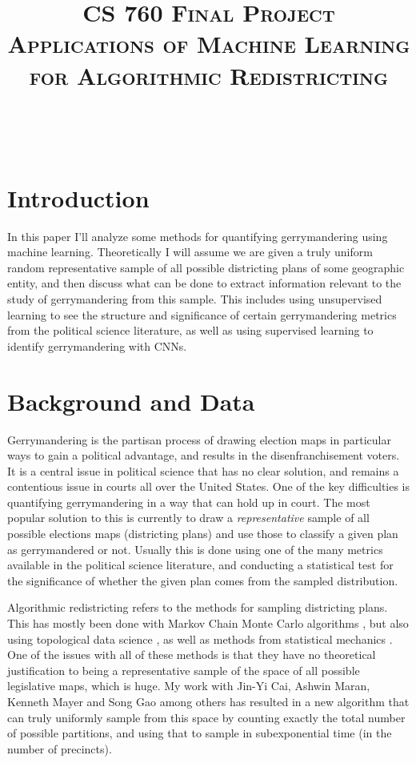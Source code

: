 \documentclass[a4paper]{article}
\title{\textsc{CS 760 Final Project\\Applications of Machine Learning for Algorithmic Redistricting}} %
\author{
	\red{Daniel Szabo} \\
	\red{9074762189}\\
}
\date{}
\theoremstyle{definition}
\begin{document}
	
	\maketitle 
	
	\section{Introduction}
	In this paper I'll analyze some methods for quantifying gerrymandering using machine learning. Theoretically I will assume we are given a truly uniform random representative sample of all possible districting plans of some geographic entity, and then discuss what can be done to extract information relevant to the study of gerrymandering from this sample. This includes using unsupervised learning to see the structure and significance of certain gerrymandering metrics from the political science literature, as well as using supervised learning to identify gerrymandering with CNNs.
	
	\section{Background and Data}
	
	Gerrymandering is the partisan process of drawing election maps in particular ways to gain a political advantage, and results in the disenfranchisement voters. It is a central issue in political science that has no clear solution, and remains a contentious issue in courts all over the United States. One of the key difficulties is quantifying gerrymandering in a way that can hold up in court. The most popular solution to this is currently to draw a \emph{representative} sample of all possible elections maps (districting plans) and use those to classify a given plan as gerrymandered or not. Usually this is done using one of the many metrics available in the political science literature, and conducting a statistical test for the significance of whether the given plan comes from the sampled distribution.
	
	Algorithmic redistricting refers to the methods for sampling districting plans. This has mostly been done with Markov Chain Monte Carlo algorithms \cite{ReCom}, but also using topological data science \cite{TDS}, as well as methods from statistical mechanics \cite{StatPhys}. One of the issues with all of these methods is that they have no theoretical justification to being a representative sample of the space of all possible legislative maps, which is huge. My work with Jin-Yi Cai, Ashwin Maran, Kenneth Mayer and Song Gao among others has resulted in a new algorithm that can truly uniformly sample from this space by counting exactly the total number of possible partitions, and using that to sample in subexponential time (in the number of precincts).
	
\end{document}
